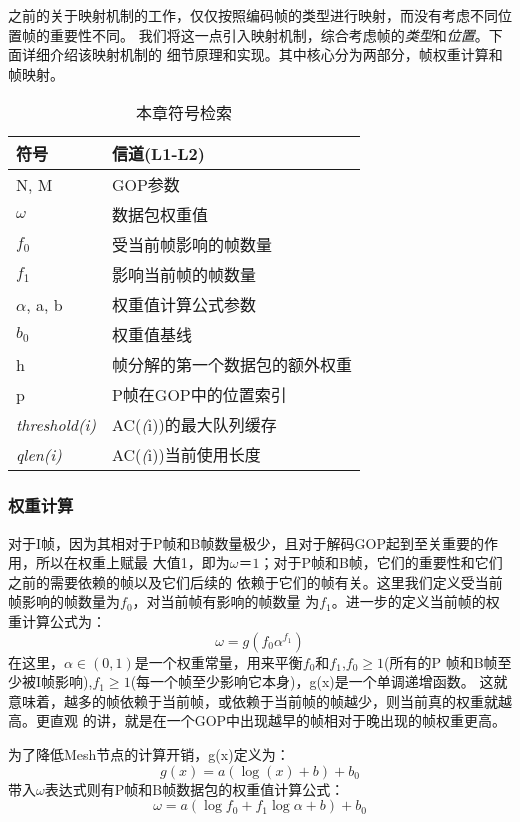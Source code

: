 之前的关于映射机制的工作，仅仅按照编码帧的类型进行映射，而没有考虑不同位置帧的重要性不同。
我们将这一点引入映射机制，综合考虑帧的\emph{类型}和\emph{位置}。下面详细介绍该映射机制的
细节原理和实现。其中核心分为两部分，帧权重计算和帧映射。

\begin{table}[htbp]
  \centering
  \caption{本章符号检索}
  \label{tab:notations}
  \begin{tabular}{p{3cm}p{8cm}}
  \hline
  符号 & 信道(L1-L2) \\
  \hline
  N, M &  GOP参数 \\
  $\omega$ &  数据包权重值 \\
  $f_{0}$ & 受当前帧影响的帧数量 \\
  $f_{1}$ & 影响当前帧的帧数量 \\
  $\alpha$, a, b & 权重值计算公式参数 \\
  $b_{0}$ & 权重值基线 \\
  h & 帧分解的第一个数据包的额外权重 \\
  p & P帧在GOP中的位置索引 \\
  \emph{threshold(i)} & AC(\emph(i))的最大队列缓存 \\
  \emph{qlen(i)} & AC(\emph(i))当前使用长度 \\
  \hline
  \end{tabular}
\end{table}

\renewcommand{\thesubsubsection}{\Alph{subsubsection}.}
\subsubsection{权重计算}
对于I帧，因为其相对于P帧和B帧数量极少，且对于解码GOP起到至关重要的作用，所以在权重上赋最
大值1，即为$\omega ＝1$；对于P帧和B帧，它们的重要性和它们之前的需要依赖的帧以及它们后续的
依赖于它们的帧有关。这里我们定义受当前帧影响的帧数量为$f_{0}$，对当前帧有影响的帧数量
为$f_{1}$。进一步的定义当前帧的权重计算公式为：
$$ \omega = g(f_{0}\alpha^{f_{1}}) $$
在这里，$\alpha \in (0,1)$是一个权重常量，用来平衡$f_{0}$和$f_{1}$,$f_{0}\geq1$(所有的P
帧和B帧至少被I帧影响),$f_{1}\geq1$(每一个帧至少影响它本身)，g(x)是一个单调递增函数。
这就意味着，越多的帧依赖于当前帧，或依赖于当前帧的帧越少，则当前真的权重就越高。更直观
的讲，就是在一个GOP中出现越早的帧相对于晚出现的帧权重更高。

为了降低Mesh节点的计算开销，g(x)定义为：
$$ g(x) = a(\log (x) + b) + b_{0} $$
带入$\omega$表达式则有P帧和B帧数据包的权重值计算公式：
$$ \omega = a(\log f_{0} + f_{1}\log \alpha + b) + b_{0} $$

